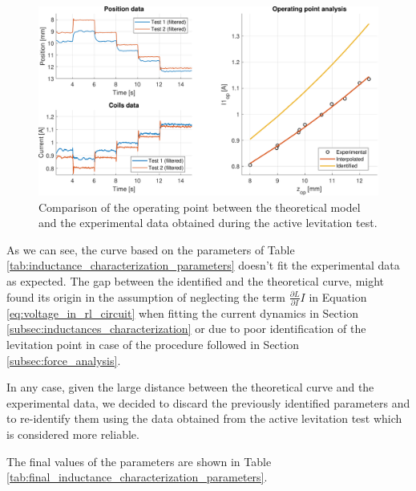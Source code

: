 \begin{figure}[H]
    \centering
    \includegraphics[width=1\textwidth]{img/MATLAB/identification/operating_point_analysis.pdf}
    \caption{Comparison of the operating point between the theoretical model and the experimental data obtained during the active levitation test.}
    \label{fig:active_levitation}
\end{figure}

As we can see, the curve based on the parameters of Table \ref{tab:inductance_characterization_parameters} doesn't fit the experimental data as expected.
The gap between the identified and the theoretical curve, might found its origin in the assumption of neglecting the term $\frac{\partial L}{\partial I} I$ in Equation \ref{eq:voltage_in_rl_circuit} when fitting the current dynamics in Section \ref{subsec:inductances_characterization} or due to poor identification of the levitation point in case of the procedure followed in Section \ref{subsec:force_analysis}.

In any case, given the large distance between the theoretical curve and the experimental data, we decided to discard the previously identified parameters and to re-identify them using the data obtained from the active levitation test which is considered more reliable.

The final values of the parameters are shown in Table \ref{tab:final_inductance_characterization_parameters}.

